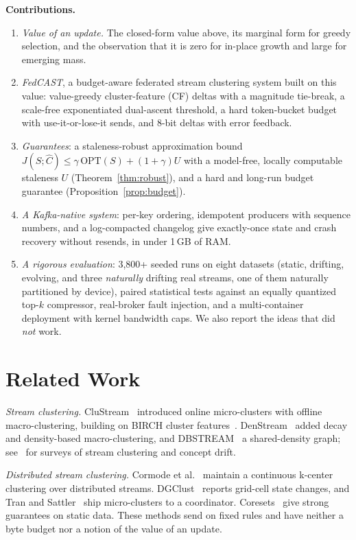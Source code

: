 \documentclass[journal]{IEEEtran}
\begin{document}
\textbf{Contributions.}
\begin{enumerate}
\item \emph{Value of an update.} The closed-form value above, its marginal form for greedy selection, and the observation that it is zero for in-place growth and large for emerging mass.
\item \emph{FedCAST}, a budget-aware federated stream clustering system built on this value: value-greedy cluster-feature (CF) deltas with a magnitude tie-break, a scale-free exponentiated dual-ascent threshold, a hard token-bucket budget with use-it-or-lose-it sends, and 8-bit deltas with error feedback.
\item \emph{Guarantees}: a staleness-robust approximation bound $J(S;\hat C)\le\gamma\,\mathrm{OPT}(S)+(1+\gamma)U$ with a model-free, locally computable staleness $U$ (Theorem~\ref{thm:robust}), and a hard and long-run budget guarantee (Proposition~\ref{prop:budget}).
\item \emph{A Kafka-native system}: per-key ordering, idempotent producers with sequence numbers, and a log-compacted changelog give exactly-once state and crash recovery without resends, in under 1\,GB of RAM.
\item \emph{A rigorous evaluation}: 3{,}800+ seeded runs on eight datasets (static, drifting, evolving, and three \emph{naturally} drifting real streams, one of them naturally partitioned by device), paired statistical tests against an equally quantized top-$k$ compressor, real-broker fault injection, and a multi-container deployment with kernel bandwidth caps. We also report the ideas that did \emph{not} work.
\end{enumerate}

\section{Related Work}\label{sec:related}
\textit{Stream clustering.} CluStream~\cite{aggarwal2003clustream} introduced online micro-clusters with offline macro-clustering, building on BIRCH cluster features~\cite{zhang1996birch}. DenStream~\cite{cao2006denstream} added decay and density-based macro-clustering, and DBSTREAM~\cite{hahsler2016dbstream} a shared-density graph; see~\cite{zubaroglu2021review,gama2014survey} for surveys of stream clustering and concept drift.

\textit{Distributed stream clustering.} Cormode et al.~\cite{cormode2007divide} maintain a continuous k-center clustering over distributed streams. DGClust~\cite{gama2011dgclust} reports grid-cell state changes, and Tran and Sattler~\cite{tran2013communication} ship micro-clusters to a coordinator. Coresets~\cite{balcan2013distributed} give strong guarantees on static data. These methods send on fixed rules and have neither a byte budget nor a notion of the value of an update.
\end{document}

